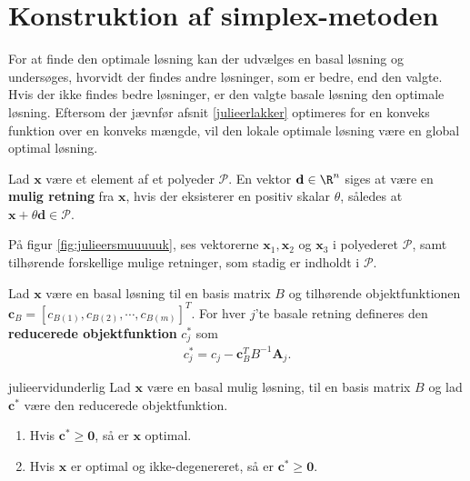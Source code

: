 %
\section{Konstruktion af simplex-metoden}
\label{julieerfantalastiskogvidunderlig}
%
For at finde den optimale løsning kan der udvælges en basal løsning og undersøges, hvorvidt der findes andre løsninger, som er bedre, end den valgte. 
Hvis der ikke findes bedre løsninger, er den valgte basale løsning den optimale løsning. 
Eftersom der jævnfør afsnit \ref{julieerlakker} optimeres for en konveks funktion over en konveks mængde, %
vil den lokale optimale løsning være en global optimal løsning. 
%
%
\begin{defn}{}{}
Lad $\textbf{x}$ være et element af et polyeder $\mathcal{P}$.
En vektor $\textbf{d}\in \R^n$ siges at være en  \textbf{mulig retning} fra $\textbf{x}$, hvis der eksisterer en positiv skalar $\theta$, således at $\textbf{x}+\theta \textbf{d}\in \mathcal{P}$.
\end{defn}
\noindent
%
På figur \ref{fig:julieersmuuuuuk}, ses vektorerne $\mathbf{x}_1, \mathbf{x}_2$ og $\mathbf{x}_3$ i polyederet $\mathcal{P}$, samt tilhørende forskellige mulige retninger, som stadig er indholdt i $\mathcal{P}$.
%

%
%
%
\begin{defn}{}{}
Lad $\mathbf{x}$ være en basal løsning til en basis matrix $B$ og tilhørende objektfunktionen $\mathbf{c}_B=[ c_{B(1)},c_{B(2)}, \cdots , c_{B(m)} ]^T.$
For hver $j$'te basale retning defineres den \textbf{reducerede objektfunktion} $c_j^*$ som
\begin{align*}
c_j^* = c_j - \mathbf{c}_B^T B^{-1} \mathbf{A}_j.
\end{align*} 
%
\end{defn}
\noindent
%
%
\begin{thm}{}{julieervidunderlig}
Lad $\mathbf{x}$ være en basal mulig løsning, til en basis matrix $B$ og lad $\mathbf{c}^*$ være den reducerede objektfunktion. 
\begin{enumerate}[label = (\alph*)]
\item Hvis $\mathbf{c}^* \geq \mathbf{0}$, så er $\mathbf{x}$ optimal.
\item Hvis $\mathbf{x}$ er optimal og ikke-degenereret, så er $\mathbf{c}^* \geq \mathbf{0}$.
\end{enumerate}
\end{thm}

